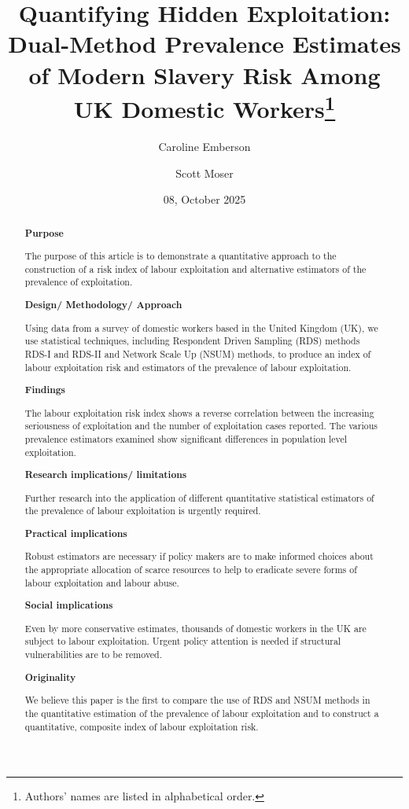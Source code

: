 \documentclass[
  12pt,
  letterpaper,
  DIV=11,
  numbers=noendperiod]{scrartcl}
\title{Quantifying Hidden Exploitation: Dual-Method Prevalence Estimates
of Modern Slavery Risk Among UK Domestic Workers\footnote{Authors' names
  are listed in alphabetical order.}}
\author{Caroline Emberson \and Scott Moser}
\date{08, October 2025}
\theoremstyle{plain}
\theoremstyle{definition}
\begin{document}
\maketitle
\begin{abstract}
\textbf{Purpose}

The purpose of this article is to demonstrate a quantitative approach to
the construction of a risk index of labour exploitation and alternative
estimators of the prevalence of exploitation.

\textbf{Design/ Methodology/ Approach}

Using data from a survey of domestic workers based in the United Kingdom
(UK), we use statistical techniques, including Respondent Driven
Sampling (RDS) methods RDS-I and RDS-II and Network Scale Up (NSUM)
methods, to produce an index of labour exploitation risk and estimators
of the prevalence of labour exploitation.

\textbf{Findings}

The labour exploitation risk index shows a reverse correlation between
the increasing seriousness of exploitation and the number of
exploitation cases reported. The various prevalence estimators examined
show significant differences in population level exploitation.

\textbf{Research implications/ limitations}

Further research into the application of different quantitative
statistical estimators of the prevalence of labour exploitation is
urgently required.

\textbf{Practical implications}

Robust estimators are necessary if policy makers are to make informed
choices about the appropriate allocation of scarce resources to help to
eradicate severe forms of labour exploitation and labour abuse.

\textbf{Social implications}

Even by more conservative estimates, thousands of domestic workers in
the UK are subject to labour exploitation. Urgent policy attention is
needed if structural vulnerabilities are to be removed.

\textbf{Originality}

We believe this paper is the first to compare the use of RDS and NSUM
methods in the quantitative estimation of the prevalence of labour
exploitation and to construct a quantitative, composite index of labour
exploitation risk.
\end{abstract}
\end{document}
